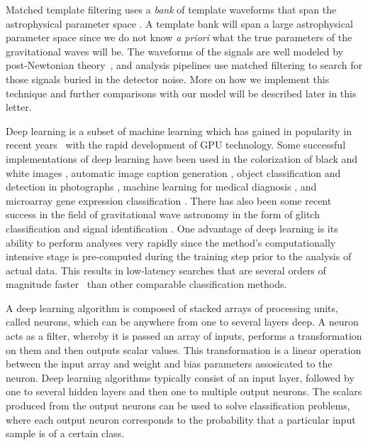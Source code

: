\documentclass[%
showpacs,
 amsmath,amssymb,
 aps,
 twocolumn,
 prl,
 reprint,
floatfix,
]{revtex4-1}
\begin{document}
%
%
Matched template filtering uses a \textit{bank} of template waveforms that span
the astrophysical parameter space \cite{PhysRevD.44.3819, PhysRevD.49.1707,
PhysRevD.53.6749, PhysRevD.60.022002, 0264-9381-23-18-002, PhysRevD.80.104014, Blanchet2014, PhysRevD.89.061502}. A template bank will span a large astrophysical parameter space since we do not
know \textit{a priori} what the true parameters of the gravitational waves will
be. The waveforms of the signals are well modeled by post-Newtonian
theory~\cite{PhysRevD.84.049901,PhysRevD.80.084043,Blanchet2014,PhysRevD.93.084054},
and analysis pipelines use matched filtering to search for those signals buried
in the detector noise. More on how we implement this technique and further
comparisons with our model will be described later in this letter.

%
%
Deep learning is a subset of machine learning which has gained in popularity in
recent years~\cite{NIPS2012_4824, 1406.2661, 1409.1556, 1412.7062, 1311.2901,
1409.4842} with the rapid development of \ac{GPU} technology. Some successful
implementations of deep learning have been used in the colorization of black
and white images \cite{1603.08511}, automatic image caption generation
\cite{1412.2306}, object classification and detection in photographs
\cite{NIPS2012_4824}, machine learning for medical diagnosis \cite{KONONENKO200189}, and microarray gene expression classification \cite{Pirooznia2008}. There has also been some recent success in the field of gravitational wave astronomy in the form of glitch classification \cite{0264-9381-34-6-064003,1706.07446} and signal identification \cite{1701.00008}. One
advantage of deep learning is its ability to perform analyses very rapidly
since the method's computationally intensive stage is pre-computed during the
training step prior to the analysis of actual data. This results in low-latency
searches that are several orders of magnitude faster~\cite{726791} than other
comparable classification methods. 

%
%
A deep learning algorithm is composed of stacked arrays of processing units, called
neurons, which can be anywhere from one to several layers deep. A neuron acts as a filter, whereby it is passed an array of inputs, performs a transformation on them and then outputs scalar values. This transformation is a linear operation between the input array and weight and bias parameters assosicated to the neuron. Deep learning algorithms typically consist of an input layer, followed by one to several hidden layers
and then one to multiple output neurons. The scalars produced from the output neurons can be used to solve classification problems, where each output neuron corresponds to the probability
that a particular input sample is of a certain class.
\end{document}
